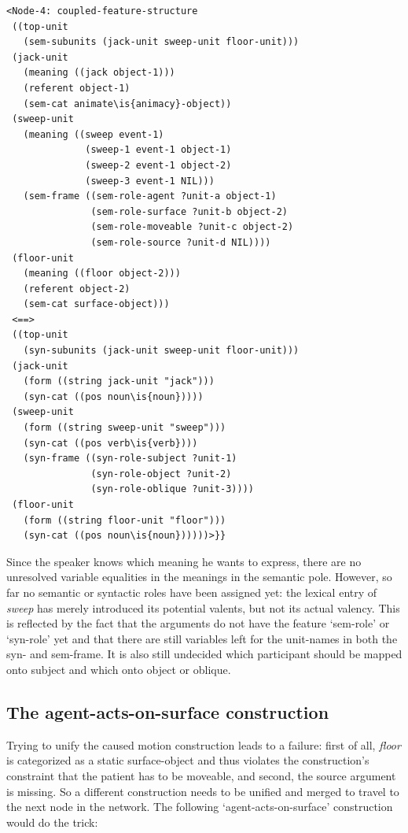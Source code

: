 \ea
\begin{lstlisting}
<Node-4: coupled-feature-structure
 ((top-unit
   (sem-subunits (jack-unit sweep-unit floor-unit)))
 (jack-unit
   (meaning ((jack object-1)))
   (referent object-1)
   (sem-cat animate\is{animacy}-object))
 (sweep-unit
   (meaning ((sweep event-1)
              (sweep-1 event-1 object-1)
              (sweep-2 event-1 object-2)
              (sweep-3 event-1 NIL)))
   (sem-frame ((sem-role-agent ?unit-a object-1)
               (sem-role-surface ?unit-b object-2)
               (sem-role-moveable ?unit-c object-2)
               (sem-role-source ?unit-d NIL))))
 (floor-unit
   (meaning ((floor object-2)))
   (referent object-2)
   (sem-cat surface-object)))
 <==>
 ((top-unit
   (syn-subunits (jack-unit sweep-unit floor-unit)))
 (jack-unit
   (form ((string jack-unit "jack")))
   (syn-cat ((pos noun\is{noun}))))
 (sweep-unit
   (form ((string sweep-unit "sweep")))
   (syn-cat ((pos verb\is{verb})))
   (syn-frame ((syn-role-subject ?unit-1)
               (syn-role-object ?unit-2)
               (syn-role-oblique ?unit-3))))
 (floor-unit
   (form ((string floor-unit "floor")))
   (syn-cat ((pos noun\is{noun})))))>}}

\end{lstlisting}
\z

Since the speaker knows which meaning he wants to express, there are no unresolved variable equalities in the meanings in the semantic pole. However, so far no semantic or syntactic roles have been assigned yet: the lexical entry of {\em sweep} has merely introduced its potential valents, but not its actual valency. This is reflected by the fact that the arguments do not have the feature `sem-role' or `syn-role' yet and that there are still variables left for the unit-names in both the syn- and sem-frame. It is also still undecided which participant should be mapped onto subject and which onto object or oblique.

\subsection{The agent-acts-on-surface construction}

\largerpage
Trying to unify the caused motion construction leads to a failure: first of all, {\em floor} is categorized as a static surface-object and thus violates the construction's constraint that the patient has to be moveable, and second, the source argument is missing. So a different construction needs to be unified and merged to travel to the next node in the network. The following `agent-acts-on-surface' construction would do the trick:

